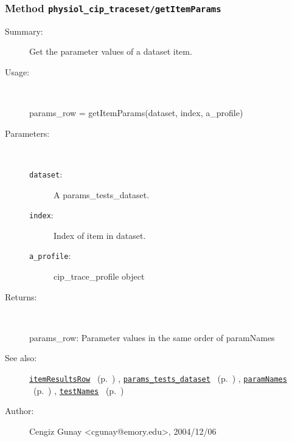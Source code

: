\subsubsection[Method \texttt{getItemParams}]{Method \texttt{physiol\_cip\_traceset/getItemParams}}%
%
\label{ref_physiol_cip_traceset__getItemParams}%
\hypertarget{ref_physiol_cip_traceset__getItemParams}{}%
\begin{description}
\item[Summary:]Get the parameter values of a dataset item.
%
\item[Usage:]~%
\begin{lyxcode}%
params\_row = getItemParams(dataset, index, a\_profile)
%
\end{lyxcode}%
%
%
\item[Parameters:]~
\begin{description}%
\item[\texttt{dataset}:]
 A params\_tests\_dataset.
\item[\texttt{index}:]
 Index of item in dataset.
\item[\texttt{a\_profile}:]
 cip\_trace\_profile object
\end{description}%
%
\item[Returns:]~

	params\_row: Parameter values in the same order of paramNames
%
%
\item[See also:]%
\hyperlink{ref_itemResultsRow}{\texttt{itemResultsRow}}%
\ (p.~\pageref{ref_itemResultsRow})%
%
, \hyperlink{ref_params_tests_dataset}{\texttt{params\_tests\_dataset}}%
\ (p.~\pageref{ref_params_tests_dataset})%
%
, \hyperlink{ref_paramNames}{\texttt{paramNames}}%
\ (p.~\pageref{ref_paramNames})%
%
, \hyperlink{ref_testNames}{\texttt{testNames}}%
\ (p.~\pageref{ref_testNames})%
%
%
\item[Author:]%
Cengiz Gunay <cgunay@emory.edu>, 2004/12/06%
\end{description}
\methodline%
